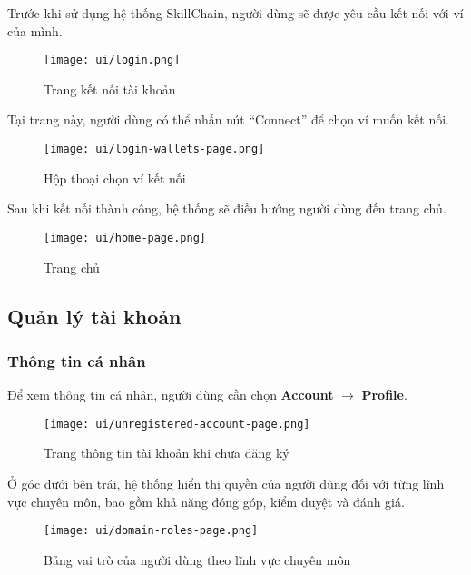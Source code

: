 Trước khi sử dụng hệ thống SkillChain, người dùng sẽ được yêu cầu kết nối với ví của mình.

\begin{figure}[H]
  \centering
  \texttt{[image: ui/login.png]}
  \caption{Trang kết nối tài khoản}
  \label{fig:login-page}
\end{figure}

Tại trang này, người dùng có thể nhấn nút ``Connect'' để chọn ví muốn kết nối.

\begin{figure}[H]
  \centering
  \texttt{[image: ui/login-wallets-page.png]}
  \caption{Hộp thoại chọn ví kết nối}
  \label{fig:login-wallets-page}
\end{figure}

Sau khi kết nối thành công, hệ thống sẽ điều hướng người dùng đến trang chủ.

\begin{figure}[H]
  \centering
  \texttt{[image: ui/home-page.png]}
  \caption{Trang chủ}
  \label{fig:home-page}
\end{figure}

\subsection{Quản lý tài khoản}

\subsubsection{Thông tin cá nhân}

Để xem thông tin cá nhân, người dùng cần chọn \textbf{Account} $\rightarrow$ \textbf{Profile}.

\begin{figure}[H]
  \centering
  \texttt{[image: ui/unregistered-account-page.png]}
  \caption{Trang thông tin tài khoản khi chưa đăng ký}
  \label{fig:unregistered-account-page}
\end{figure}

Ở góc dưới bên trái, hệ thống hiển thị quyền của người dùng đối với từng lĩnh vực chuyên môn, bao gồm khả năng đóng góp, kiểm duyệt và đánh giá.

\begin{figure}[H]
  \centering
  \texttt{[image: ui/domain-roles-page.png]}
  \caption{Bảng vai trò của người dùng theo lĩnh vực chuyên môn}
  \label{fig:domain-roles-page}
\end{figure}

